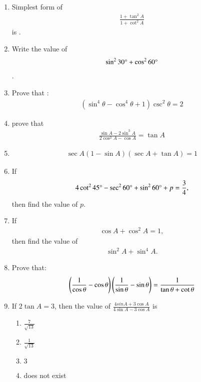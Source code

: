 
\begin{enumerate}[label=\thesubsection.\arabic*.,ref=\thesubsection.\theenumi]
\item Simplest form of 
 \begin{align}
     \frac{1 + \tan^{2}{A}}{1 + \cot^{2}{A}}
 \end{align}is .

\hfill{}\item Write the value of
 \begin{align}
	     \sin^{2}{30\degree} + \cos^{2}{60\degree}
	\end{align}.
\hfill{}
\item Prove that : 
        \begin{align}
           (\sin^{4}{\theta} - \cos^{4}{\theta} + 1)\csc^{2}{\theta} = 2 
        \end{align}
\hfill{}
\item prove that \begin{align} \frac{\sin A-2 \sin^3A}{2\cos^3A-\cos A}=\tan A\end{align} 
  \hfill{}\item \begin{align} \sec A (1-\sin A)(\sec A+\tan A)=1\end{align} 

\hfill{}\item If 
\begin{align}
    4\cot^2 45\degree - \sec^2 60\degree + \sin^2 60\degree + p = \frac{3}{4}, 
\end{align}
then find the value of $p$.
\hfill{}\item If 
\begin{align}
    \cos A+ \cos^2A=1,
\end{align}then find the value of 
\begin{align}
\sin^2A+\sin^4A.
\end{align}
\hfill{}\item Prove that:\\
\begin{align}
\left(\frac{1}{\cos\theta}-\cos\theta\right)\left(\frac{1}{\sin\theta}-\sin\theta\right) = \frac{1}{\tan\theta+\cot\theta}
\end{align}




\hfill{}\item If $2\tan A=3$, then the value of $\frac{4sin A + 3\cos A}{4\sin A - 3\cos A}$ is
\begin{enumerate}
\item $\frac{7}{\sqrt{13}}$
\item $\frac{1}{\sqrt{13}}$
\item $3$
\item does not exist
\end{enumerate}




\end{enumerate}
